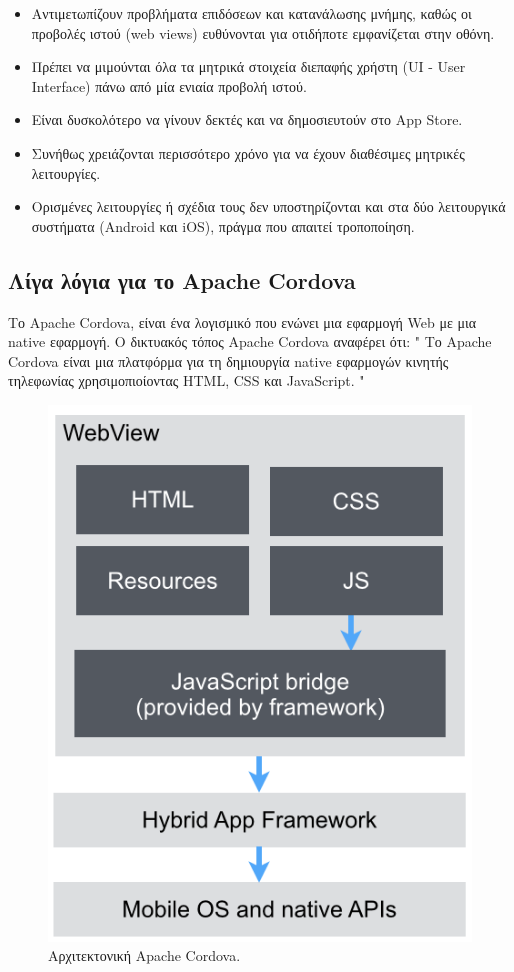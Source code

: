 \documentclass[a4paper,12pt]{article}
\begin{document}
			\begin{itemize}
				\item Αντιμετωπίζουν προβλήματα επιδόσεων και κατανάλωσης μνήμης, καθώς οι προβολές ιστού (web views) ευθύνονται για οτιδήποτε εμφανίζεται στην οθόνη.
				
				\item Πρέπει να μιμούνται όλα τα μητρικά στοιχεία διεπαφής χρήστη (UI - User Interface) πάνω από μία ενιαία προβολή ιστού.
				
				\item Είναι δυσκολότερο να γίνουν δεκτές και να δημοσιευτούν στο App Store.
				
				\item Συνήθως χρειάζονται περισσότερο χρόνο για να έχουν διαθέσιμες μητρικές λειτουργίες.
				
				\item Ορισμένες λειτουργίες ή σχέδια τους δεν υποστηρίζονται και στα δύο λειτουργικά συστήματα (Android και iOS), πράγμα που απαιτεί τροποποίηση.
			
			\end{itemize}
		\subsection{Λίγα λόγια για το Apache Cordova}
		
			Το Apache Cordova, είναι ένα λογισμικό που ενώνει μια εφαρμογή Web
			με μια native εφαρμογή. Ο δικτυακός τόπος Apache Cordova αναφέρει ότι:
			" Το Apache Cordova είναι μια πλατφόρμα για τη δημιουργία native εφαρμογών κινητής τηλεφωνίας χρησιμοπιοίοντας 
			HTML, CSS και JavaScript. "


			\begin{figure}[!htb]
				\caption{Αρχιτεκτονική Apache Cordova.}
				\vspace*{0.5cm}
				\centering
				\includegraphics[width=0.63\linewidth]{Cordova} 
			  \end{figure}
			  
\end{document}
